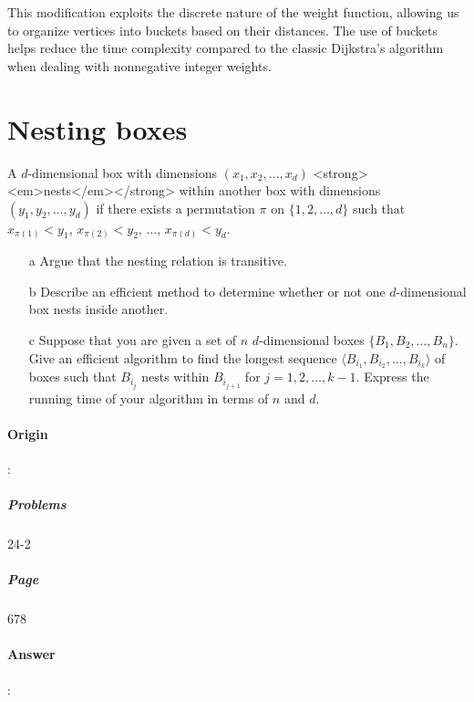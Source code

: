 \documentclass{article}
\begin{document}
This modification exploits the discrete nature of the weight function, allowing us to organize vertices into buckets based on their distances. The use of buckets helps reduce the time complexity compared to the classic Dijkstra's algorithm when dealing with nonnegative integer weights.

\section{Nesting boxes}

A $d$-dimensional box with dimensions $(x_1, x_2, \ldots, x_d)$ <strong><em>nests</em></strong> within another box with dimensions $(y_1, y_2, \ldots, y_d)$ if there exists a permutation $\pi$ on $\{1, 2, \ldots, d\}$ such that $x_{\pi(1)} < y_1$, $x_{\pi(2)} < y_2$, $\ldots$, $x_{\pi(d)} < y_d$.

\begin{enumerate}
  \item[a] Argue that the nesting relation is transitive.
  \item[b] Describe an efficient method to determine whether or not one $d$-dimensional box nests inside another.
  \item[c] Suppose that you are given a set of $n$ $d$-dimensional boxes $\{B_1, B_2, \ldots, B_n\}$. Give an efficient algorithm to find the longest sequence $\langle B_{i_1}, B_{i_2}, \ldots, B_{i_k} \rangle$ of boxes such that $B_{i_j}$ nests within $B_{i_{j + 1}}$ for $j = 1, 2, \ldots, k - 1$. Express the running time of your algorithm in terms of $n$ and $d$.
\end{enumerate}

\paragraph{Origin}:
  \subparagraph{Problems}24-2
  \subparagraph{Page}678
\paragraph{Answer}:
\end{document}
